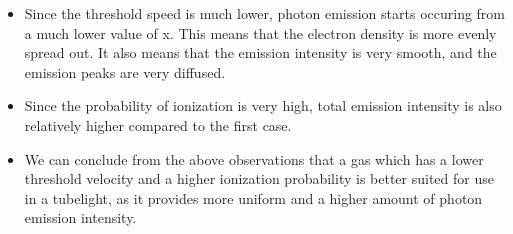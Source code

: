 \documentclass[11pt]{article}
\begin{document}
\begin{itemize}
\item
  Since the threshold speed is much lower, photon emission starts
  occuring from a much lower value of x. This means that the electron
  density is more evenly spread out. It also means that the emission
  intensity is very smooth, and the emission peaks are very diffused.
\item
  Since the probability of ionization is very high, total emission
  intensity is also relatively higher compared to the first case.
\item
  We can conclude from the above observations that a gas which has a
  lower threshold velocity and a higher ionization probability is better
  suited for use in a tubelight, as it provides more uniform and a
  higher amount of photon emission intensity.
\end{itemize}

	


    
    
    
    
\end{document}
